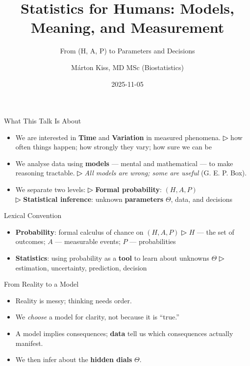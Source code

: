 \documentclass[
  12pt,
  ignorenonframetext,
  aspectratio=169,
]{beamer}
\title{Statistics for Humans: Models, Meaning, and Measurement}
\subtitle{From (H, A, P) to Parameters and Decisions}
\author{Márton Kiss, MD MSc (Biostatistics)}
\date{2025-11-05}
\providecommand{\tightlist}{%
  \setlength{\itemsep}{0pt}\setlength{\parskip}{0pt}}
\begin{document}
\frame{\titlepage}


\begin{frame}{What This Talk Is About}
\label{what-this-talk-is-about}
\begin{itemize}
\tightlist
\item
  We are interested in \textbf{Time} and \textbf{Variation} in measured
  phenomena. ▷ how often things happen; how strongly they vary; how sure
  we can be
\item
  We analyse data using \textbf{models} --- mental and mathematical ---
  to make reasoning tractable. ▷ \emph{All models are wrong; some are
  useful} (G. E. P. Box).
\item
  We separate two levels: ▷ \textbf{Formal probability}: \((H,A,P)\)\\
  ▷ \textbf{Statistical inference}: unknown \textbf{parameters}
  \(\Theta\), data, and decisions
\end{itemize}
\end{frame}

\begin{frame}{Lexical Convention}
\label{lexical-convention}
\begin{itemize}
\tightlist
\item
  \textbf{Probability}: formal calculus of chance on \((H,A,P)\) ▷ \(H\)
  --- the set of outcomes; \(A\) --- measurable events; \(P\) ---
  probabilities
\item
  \textbf{Statistics}: using probability as a \textbf{tool} to learn
  about unknowns \(\Theta\) ▷ estimation, uncertainty, prediction,
  decision
\end{itemize}
\end{frame}

\begin{frame}{From Reality to a Model}
\label{from-reality-to-a-model}
\begin{itemize}
\tightlist
\item
  Reality is messy; thinking needs order.
\item
  We \emph{choose} a model for clarity, not because it is ``true.''
\item
  A model implies consequences; \textbf{data} tell us which consequences
  actually manifest.
\item
  We then infer about the \textbf{hidden dials} \(\Theta\).
\end{itemize}
\end{frame}
\end{document}
